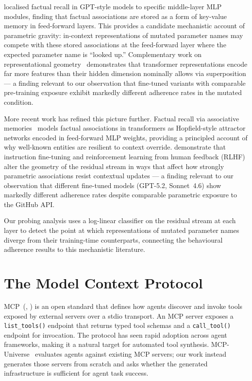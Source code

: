 \citet{meng2022rome} localised factual recall in GPT-style models to specific middle-layer MLP modules, finding that factual associations are stored as a form of key-value memory in feed-forward layers. This provides a candidate mechanistic account of parametric gravity: in-context representations of mutated parameter names may compete with these stored associations at the feed-forward layer where the expected parameter name is ``looked up.'' Complementary work on representational geometry~\citep{elhage2022superposition} demonstrates that transformer representations encode far more features than their hidden dimension nominally allows via superposition --- a finding relevant to our observation that fine-tuned variants with comparable pre-training exposure exhibit markedly different adherence rates in the mutated condition.

More recent work has refined this picture further. Factual recall via associative memories~\citep{factualrecall2025} models factual associations in transformers as Hopfield-style attractor networks encoded in feed-forward MLP weights, providing a principled account of why well-known entities are resilient to context
override. \citet{posttrainingreshapes2025} demonstrate that instruction fine-tuning and reinforcement learning from human feedback (RLHF) alter the geometry of the residual stream in ways that affect how strongly parametric
associations resist contextual updates --- a finding relevant to our observation that different fine-tuned models (GPT-5.2, Sonnet~4.6) show markedly different adherence rates despite comparable parametric exposure to the GitHub API.

Our probing analysis uses a log-linear classifier on the
residual stream at each layer to detect the point at which representations of mutated parameter names diverge from their training-time counterparts, connecting the behavioural adherence results to this mechanistic literature.

\section{The Model Context Protocol}
\label{sec:related_work:mcp}

MCP~(\citeauthor{anthropic2024mcp}, \citeyear{anthropic2024mcp}) is an open standard that defines how agents discover and invoke tools exposed by external servers over a stdio transport. An MCP server exposes a \texttt{list\_tools()} endpoint that returns typed tool schemas and a \texttt{call\_tool()} endpoint for invocation. The protocol has seen rapid adoption across agent frameworks, making it a natural target for automated tool synthesis. MCP-Universe~\citep{mcpuniverse2025} evaluates agents against existing MCP servers; our work instead generates those servers from scratch and asks whether the generated infrastructure is sufficient for agent task success.

